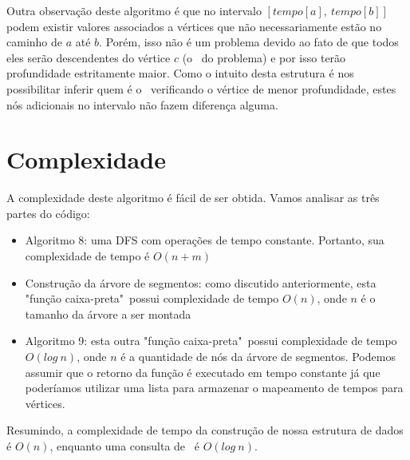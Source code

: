 Outra observação deste algoritmo é que no intervalo $[tempo[a],\ tempo[b]]$ podem existir valores associados a vértices que não necessariamente estão no caminho de $a$ até $b$. Porém, isso não é um problema devido ao fato de que todos eles serão descendentes do vértice $c$ (o \LCA\ do problema) e por isso terão profundidade estritamente maior. Como o intuito desta estrutura é nos possibilitar inferir quem é o \LCA\ verificando o vértice de menor profundidade, estes nós adicionais no intervalo não fazem diferença alguma.

\vspace{5cm}

\section{Complexidade}

A complexidade deste algoritmo é fácil de ser obtida. Vamos analisar as três partes do código:

\begin{itemize}
    \item Algoritmo 8: uma DFS com operações de tempo constante. Portanto, sua complexidade de tempo é $O(n+m)$
    \item Construção da árvore de segmentos: como discutido anteriormente, esta "função caixa-preta"\  possui complexidade de tempo $O(n)$, onde $n$ é o tamanho da árvore a ser montada
    \item Algoritmo 9: esta outra "função caixa-preta"\ possui complexidade de tempo $O(log\ n)$, onde $n$ é a quantidade de nós da árvore de segmentos. Podemos assumir que o retorno da função é executado em tempo constante já que poderíamos utilizar uma lista para armazenar o mapeamento de tempos para vértices.
\end{itemize}

Resumindo, a complexidade de tempo da construção de nossa estrutura de dados é $O(n)$, enquanto uma consulta de \LCA\ é $O(log\ n)$.
